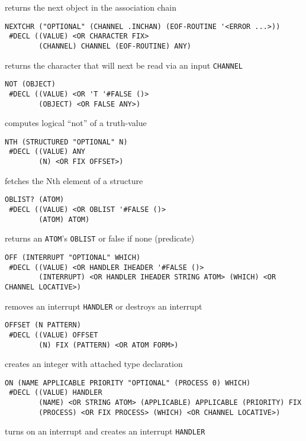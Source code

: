 \documentclass[a4paper]{scrbook}
\begin{document}
returns the next object in the association chain

\begin{verbatim}
NEXTCHR ("OPTIONAL" (CHANNEL .INCHAN) (EOF-ROUTINE '<ERROR ...>))
 #DECL ((VALUE) <OR CHARACTER FIX>
        (CHANNEL) CHANNEL (EOF-ROUTINE) ANY)
\end{verbatim}

returns the character that will next be read via an input \texttt{CHANNEL}

\begin{verbatim}
NOT (OBJECT)
 #DECL ((VALUE) <OR 'T '#FALSE ()>
        (OBJECT) <OR FALSE ANY>)
\end{verbatim}

computes logical ``not'' of a truth-value

\begin{verbatim}
NTH (STRUCTURED "OPTIONAL" N)
 #DECL ((VALUE) ANY
        (N) <OR FIX OFFSET>)
\end{verbatim}

fetches the Nth element of a structure

\begin{verbatim}
OBLIST? (ATOM)
 #DECL ((VALUE) <OR OBLIST '#FALSE ()>
        (ATOM) ATOM)
\end{verbatim}

returns an \texttt{ATOM}'s \texttt{OBLIST} or false if none (predicate)

\begin{verbatim}
OFF (INTERRUPT "OPTIONAL" WHICH)
 #DECL ((VALUE) <OR HANDLER IHEADER '#FALSE ()>
        (INTERRUPT) <OR HANDLER IHEADER STRING ATOM> (WHICH) <OR CHANNEL LOCATIVE>)
\end{verbatim}

removes an interrupt \texttt{HANDLER} or destroys an interrupt

\begin{verbatim}
OFFSET (N PATTERN)
 #DECL ((VALUE) OFFSET
        (N) FIX (PATTERN) <OR ATOM FORM>)
\end{verbatim}

creates an integer with attached type declaration

\begin{verbatim}
ON (NAME APPLICABLE PRIORITY "OPTIONAL" (PROCESS 0) WHICH)
 #DECL ((VALUE) HANDLER
        (NAME) <OR STRING ATOM> (APPLICABLE) APPLICABLE (PRIORITY) FIX
        (PROCESS) <OR FIX PROCESS> (WHICH) <OR CHANNEL LOCATIVE>)
\end{verbatim}

turns on an interrupt and creates an interrupt \texttt{HANDLER}
\end{document}
